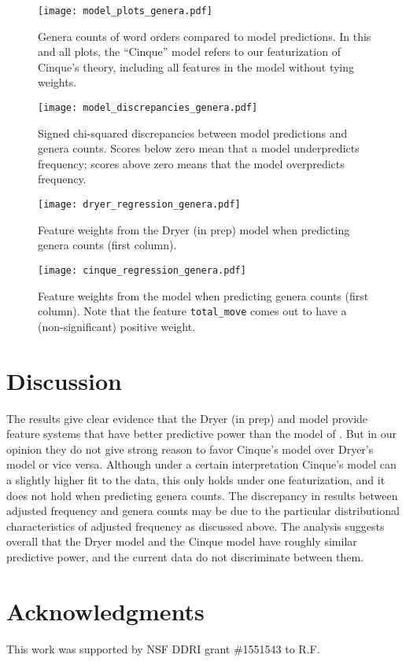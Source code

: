 \documentclass[11pt]{article}
\begin{document}
\begin{figure}[ht!]
  \centering
  \texttt{[image: model\_plots\_genera.pdf]}
  \caption{Genera counts of word orders compared to model predictions. In this and all plots, the ``Cinque'' model refers to our featurization of Cinque's theory, including all features in the model without tying weights.}
  \label{fig:genera-predictions}
\end{figure}

\begin{figure}[ht!]
  \centering
  \texttt{[image: model\_discrepancies\_genera.pdf]}
  \caption{Signed chi-squared discrepancies between model predictions and genera counts. Scores below zero mean that a model underpredicts frequency; scores above zero means that the model overpredicts frequency.}
  \label{fig:genera-discrepancies}
\end{figure}

\begin{figure}[ht!]
  \centering
  \texttt{[image: dryer\_regression\_genera.pdf]}
  \caption{Feature weights from the Dryer (in prep) model when predicting genera counts (first column).}
  \label{fig:dryer-model-genera}
\end{figure}

\begin{figure}[ht!]
  \centering
  \texttt{[image: cinque\_regression\_genera.pdf]}
  \cprotect\caption{Feature weights from the \citet{cinque2005deriving} model when predicting genera counts (first column). Note that the feature \verb+total_move+ comes out to have a (non-significant) positive weight.}
  \label{fig:cinque-model-genera}
\end{figure}

\section{Discussion}

The results give clear evidence that the Dryer (in prep) and \citet{cinque2005deriving} model provide feature systems that have better predictive power than the model of \citet{cysouw2010dealing}. But in our opinion they do not give strong reason to favor Cinque's model over Dryer's model or vice versa. Although under a certain interpretation Cinque's model can a slightly higher fit to the data, this only holds under one featurization, and it does not hold when predicting genera counts. The discrepancy in results between adjusted frequency and genera counts may be due to the particular distributional characteristics of adjusted frequency as discussed above. The analysis suggests overall that the Dryer model and the Cinque model have roughly similar predictive power, and the current data do not discriminate between them.


\section*{Acknowledgments} 

This work was supported by NSF DDRI grant \#1551543 to R.F.

\nocite{dryer2017order}



\end{document}
